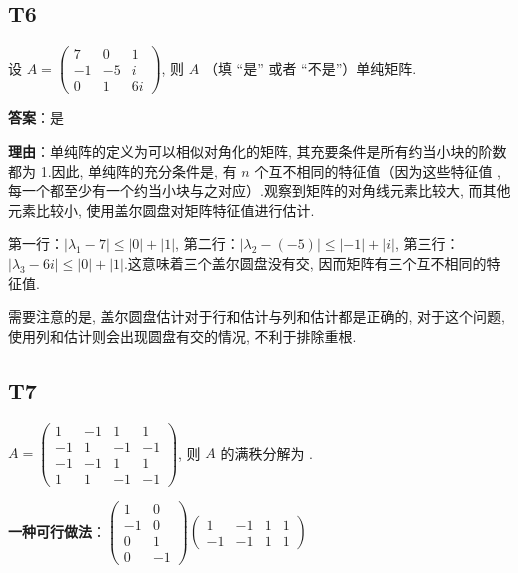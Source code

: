 \documentclass{article}
\begin{document}
\subsection{T6}

\par 设 $A=\begin{pmatrix}
	7 & 0 & 1\\
	-1 & -5 & i\\
	0 & 1 & 6i
\end{pmatrix}$, 则 $A$ \underline{\phantom{empty\_space}}（填 “是” 或者 “不是”）单纯矩阵.

\par \textbf{答案}：是

\par \textbf{理由}：单纯阵的定义为可以相似对角化的矩阵, 其充要条件是所有约当小块的阶数都为 1.因此, 单纯阵的充分条件是, 有 $n$ 个互不相同的特征值（因为这些特征值 , 每一个都至少有一个约当小块与之对应）.观察到矩阵的对角线元素比较大, 而其他元素比较小, 使用盖尔圆盘对矩阵特征值进行估计.

第一行：$|\lambda_1-7|\leq |0| + |1|$, 第二行：$|\lambda_2-(-5)|\leq |-1| + |i|$, 第三行：$|\lambda_3-6i|\leq |0| + |1|$.这意味着三个盖尔圆盘没有交, 因而矩阵有三个互不相同的特征值.

需要注意的是, 盖尔圆盘估计对于行和估计与列和估计都是正确的, 对于这个问题, 使用列和估计则会出现圆盘有交的情况, 不利于排除重根.

\subsection{T7}

\par $A=\begin{pmatrix}
	1 & -1 & 1 & 1\\
	-1 & 1 & -1 & -1\\
	-1 & -1 & 1 & 1\\
	1 & 1 & -1 & -1
\end{pmatrix}$, 则 $A$ 的满秩分解为 \underline{\phantom{empty\_space}}.

\par \textbf{一种可行做法}：$\begin{pmatrix}
	1 & 0\\
	-1 & 0\\
	0 & 1\\
	0 & -1
\end{pmatrix} \begin{pmatrix}
	1 & -1 & 1 & 1\\
	-1 & -1 & 1 & 1
\end{pmatrix}$
\end{document}
